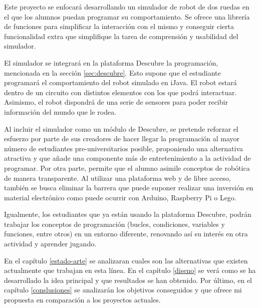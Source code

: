 Este proyecto se enfocará desarrollando un simulador de robot de dos ruedas en el que los alumnos puedan programar su comportamiento. Se ofrece una librería de funciones para simplificar la interacción con el mismo y conseguir cierta funcionalidad extra que simplifique la tarea de comprensión y usabilidad del simulador.

El simulador se integrará en la plataforma Descubre la programación, mencionada en la sección \ref{sec:descubre}. Esto supone que el estudiante programará el comportamiento del robot simulado en iJava. El robot estará dentro de un circuito con distintos elementos con los que podrá interactuar. Asimismo, el robot dispondrá de una serie de sensores para poder recibir información del mundo que le rodea.

Al incluir el simulador como un módulo de Descubre, se pretende reforzar el esfuerzo por parte de sus creadores de hacer llegar la programación al mayor número de estudiantes pre-universitarios posible, proponiendo una alternativa atractiva y que añade una componente más de entretenimiento a la actividad de programar. Por otra parte, permite que el alumno asimile conceptos de robótica de manera transparente. Al utilizar una plataforma web y de libre acceso, también se busca eliminar la barrera que puede suponer realizar una inversión en material electrónico como puede ocurrir con Arduino, Raspberry Pi o Lego.


Igualmente, los estudiantes que ya están usando la plataforma Descubre, podrán trabajar los conceptos de programación (bucles, condiciones, variables y funciones, entre otros) en un entorno diferente, renovando así su interés en otra actividad y aprender jugando.




En el capítulo \ref{estado-arte} se analizaran cuales son las alternativas que existen actualmente que trabajan en esta línea. En el capítulo \ref{diseno} se verá como se ha desarrollado la idea principal y que resultados se han obtenido. Por último, en el capítulo \ref{conslusiones} se analizarán los objetivos conseguidos y que ofrece mi propuesta en comparación a los proyectos actuales.



